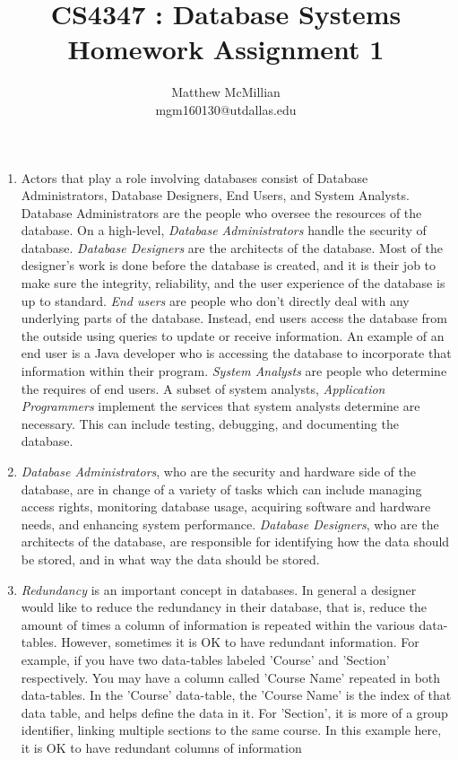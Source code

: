 \documentclass[12pt]{article}
\begin{document}
\title{CS4347 : Database Systems\\Homework Assignment 1}
\author{Matthew McMillian\\mgm160130@utdallas.edu}
\maketitle



\begin{enumerate}
	
	\item Actors that play a role involving databases consist of Database Administrators, Database Designers, End Users, and System Analysts. Database Administrators are the people who oversee the resources of the database. On a high-level, \textit{Database Administrators} handle the security of database. \textit{Database Designers} are the architects of the database. Most of the designer's work is done before the database is created, and it is their job to make sure the integrity, reliability, and the user experience of the database is up to standard. \textit{End users} are people who don't directly deal with any underlying parts of the database. Instead, end users access the database from the outside using queries to update or receive information. An example of an end user is a Java developer who is accessing the database to incorporate that information within their program. \textit{System Analysts} are people who determine the requires of end users. A subset of system analysts, \textit{Application Programmers} implement the services that system analysts determine are necessary. This can include testing, debugging, and documenting the database.
	
	\item \textit{Database Administrators}, who are the security and hardware side of the database, are in change of a variety of tasks which can include managing access rights, monitoring database usage, acquiring software and hardware needs, and enhancing system performance. \textit{Database Designers}, who are the architects of the database, are responsible for identifying how the data should be stored, and in what way the data should be stored.
	
	\item \textit{Redundancy} is an important concept in databases. In general a designer would like to reduce the redundancy in their database, that is, reduce the amount of times a column of information is repeated within the various data-tables. However, sometimes it is OK to have redundant information. For example, if you have two data-tables labeled 'Course' and 'Section' respectively. You may have a column called 'Course Name' repeated in both data-tables. In the 'Course' data-table, the 'Course Name' is the index of that data table, and  helps define the data in it. For 'Section', it is more of a group identifier, linking multiple sections to the same course. In this example here, it is OK to have redundant columns of information
	

\end{enumerate}
\end{document}
